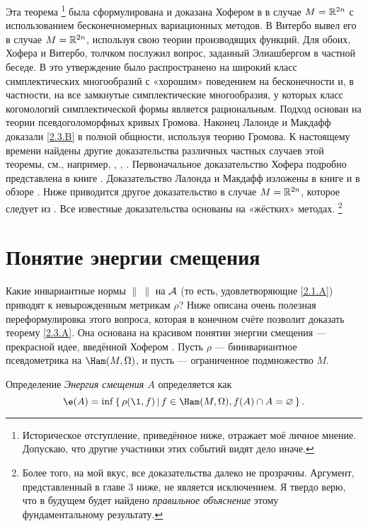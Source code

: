 Эта теорема%
\footnote{Историческое отступление, приведённое ниже, отражает моё личное мнение.
Допускаю, что другие участники этих событий видят дело иначе.}
была сформулирована и доказана Хофером в \cite{H1} в случае $M = \mathbb{R}^{2n}$ с использованием бесконечномерных вариационных методов.
В \cite{V1} Витербо вывел его в случае $M = \mathbb{R}^{2n}$, используя свою теории производящих функций.
Для обоих, Хофера и Витербо, толчком послужил вопрос, заданный Элиашбергом в частной беседе.
В \cite{P1} это утверждение было распространено на широкий класс симплектических многообразий с «хорошим» поведением на бесконечности и, в частности, на все замкнутые симплектические многообразия, у которых класс когомологий симплектической формы является рациональным.
Подход \cite{P1} основан на теории псевдоголоморфных кривых Громова.
Наконец \cite{LM1} Лалонде и Макдафф доказали \ref{2.3.B} в полной общности, используя теорию Громова.
К настоящему времени найдены другие доказательства различных частных случаев этой теоремы, см., например, \cite{Ch}, \cite{O3}, \cite{Sch3}.
Первоначальное доказательство Хофера подробно представлена в книге
\cite{HZ}.
Доказательство Лалонда и Макдафф изложены в книге \cite{MS} и в обзоре \cite{L}.
Ниже приводится другое доказательство в случае $M = \mathbb{R}^{2n}$, которое следует из \cite{P1}.
Все известные доказательства основаны на «жёстких» методах.%
\footnote{Более того, на мой вкус, все доказательства далеко не прозрачны.
Аргумент, представленный в главе 3 ниже, не является исключением.
Я твердо верю, что в будущем будет найдено {}\emph{правильное объяснение} этому фундаментальному результату.}

\section{Понятие энергии смещения}\label{sec:2.4}

Какие инвариантные нормы $\|\ \|$ на $\mathcal{A}$ (то есть, удовлетворяющие \ref{2.1.A}) приводят к невырожденным метрикам $\rho$?
Ниже описана очень полезная переформулировка этого вопроса, которая в конечном счёте позволит доказать теорему \ref{2.3.A}.
Она основана на красивом понятии энергии смещения --- прекрасной идее, введённой Хофером \cite{H1}.
Пусть $\rho$ --- биинвариантное псевдометрика на $\Ham (M, \Omega)$, и пусть  --- ограниченное подмножество $M$.

\begin{ex*}{Определение}
\emph{Энергия смещения $A$} определяется как
\[\e(A) = \inf \set{\rho (\1, f)}{f \in \Ham (M, \Omega), f (A) \cap A = \emptyset}.\]
\end{ex*}

